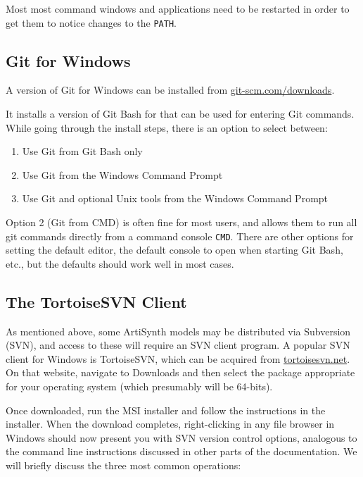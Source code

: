 \fi %
\fi %

\begin{sideblock}
Most most command windows and applications need to be restarted in
order to get them to notice changes to the {\tt PATH}.
\end{sideblock}

\ifWindows

\subsection{Git for Windows}
\label{GitForWindows}

A version of Git for Windows can be installed from
\href{https://git-scm.com/downloads}{git-scm.com/downloads}.

It installs a version of Git Bash for that can be used for entering
Git commands.  While going through the install steps, there is an
option to select between:

\begin{enumerate}

\item Use Git from Git Bash only
\item Use Git from the Windows Command Prompt
\item Use Git and optional Unix tools from the Windows Command Prompt

\end{enumerate}

Option 2 (Git from CMD) is often fine for most users, and allows them
to run all git commands directly from a command console {\tt CMD}.  There are
other options for setting the default editor, the default
console to open when starting Git Bash, etc., but the defaults should
work well in most cases.

\subsection{The TortoiseSVN Client}
\label{TortoiseSVN}

As mentioned above, some ArtiSynth models may be distributed via
Subversion (SVN), and access to these will require an SVN client
program. A popular SVN client for Windows is TortoiseSVN, which can be
acquired from
\href{http://tortoisesvn.net}{tortoisesvn.net}. On that website,
navigate to {\sf Downloads} and then select the package appropriate
for your operating system (which presumably will be 64-bits).

Once downloaded, run the MSI installer and follow the instructions in
the installer. When the download completes, right-clicking in any file
browser in Windows should now present you with SVN version control
options, analogous to the command line instructions discussed in other
parts of the documentation. We will briefly discuss the three
most common operations:

